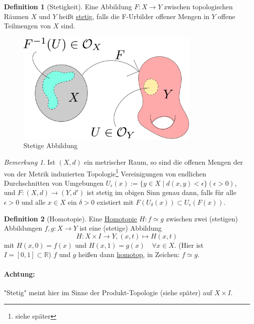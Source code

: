 \documentclass[a4paper,11pt,notitlepage]{report}
\theoremstyle{remark}
\newtheorem{remark}{Bemerkung}[chapter]
\theoremstyle{definition}
\newtheorem{definition}{Definition}[chapter]
\newcommand{\R}{{\ensuremath{\mathbb{R}}}}
\begin{document}
\begin{definition}[Stetigkeit]
Eine Abbildung $F \colon X \rightarrow Y$ zwischen topologischen Räumen $X$ und $Y$ heißt \underline{stetig}, falls die F-Urbilder offener Mengen in $Y$ offene Teilmengen von $X$ sind.
\end{definition}

\begin{figure}[h]
\centering
\includegraphics[width=0.8\textwidth]{images/stetigeAbb.pdf}
\caption{Stetige Abbildung}
\end{figure}

\begin{remark}
Ist $(X,d)$ ein metrischer Raum, so sind die offenen Mengen der von der Metrik induzierten Topologie\footnote{siehe später} Vereinigungen von endlichen Durchschnitten von Umgebungen
$U_{\epsilon}(x):=\{y \in X \mid d (x,y) < \epsilon \} (\epsilon > 0)$, 
und $F \colon (X,d) \rightarrow (Y,d')$ ist stetig im obigen Sinn genau dann, falls für alle $\epsilon > 0$ und alle $x \in X$ ein $\delta > 0$ existiert mit $F(U_\delta (x)) \subset U_\epsilon (F(x))$.
\end{remark}

\begin{definition}[Homotopie]
Eine \underline{Homotopie} $H \colon f \simeq g$ zwischen zwei (stetigen) Abbildungen $f,g \colon X \rightarrow Y$ ist eine (stetige) Abbildung $$H \colon X \times I \rightarrow Y, (x,t) \mapsto H(x,t)$$ 
mit $H(x,0) = f(x) \text{ und } H(x,1) = g(x) \quad \forall x \in X$.
\newline
(Hier ist $I = [0,1] \subset \R$)
\newline
$f$ und $g$ heißen dann \underline{homotop}, in Zeichen: $f \simeq g$.
\end{definition}

\paragraph{Achtung:} "Stetig" meint hier im Sinne der Produkt-Topologie (siehe später) auf $
X \times I$.
\end{document}
